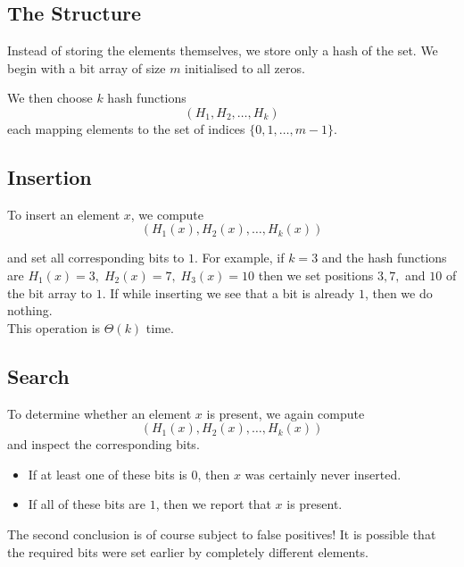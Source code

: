 \subsection{The Structure}

Instead of storing the elements themselves, we store only a hash of the set. We begin with 
a bit array of size $m$ initialised to all zeros.

\begin{center}
\end{center}

We then choose $k$ hash functions
\[
\left(H_1,H_2,\ldots,H_k\right)
\]
each mapping elements to the set of indices $\{0,1,\ldots,m-1\}$.

\subsection{Insertion}

To insert an element $x$, we compute
\[
\left(H_1(x),H_2(x),\ldots,H_k(x)\right)
\]

and set all corresponding bits to $1$. For example, if $k=3$ and the hash functions are $H_1(x)=3,\; H_2(x)=7,\; H_3(x)=10$
then we set positions $3,7,$ and $10$ of the bit array to $1$. If while inserting we see that a bit is already $1$, then we do nothing.\\


\noindent This operation is $\Theta(k)$ time.
\subsection{Search}

To determine whether an element $x$ is present, we again compute
\[
\left(H_1(x),H_2(x),\ldots,H_k(x)\right)
\]
and inspect the corresponding bits.
\begin{itemize}
\item If at least one of these bits is $0$, then $x$ was certainly never inserted.
\item If all of these bits are $1$, then we report that $x$ is present.
\end{itemize}
The second conclusion is of course subject to false positives! It is possible that the required bits 
were set earlier by completely different elements.\\


